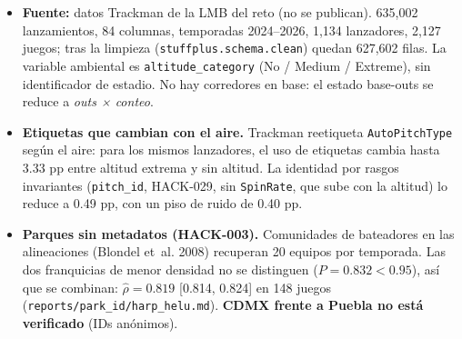 \documentclass[
  english,
  spanish,
  10pt,
  letterpaper,
]{article}
\providecommand{\tightlist}{%
  \setlength{\itemsep}{0pt}\setlength{\parskip}{0pt}}
\let\diablosTT\texttt
\renewcommand{\texttt}[1]{{\color{gris}\fontsize{8.2}{10}\selectfont\diablosTT{#1}}}
\begin{document}
\begin{itemize}
\tightlist
\item
  \textbf{Fuente:} datos Trackman de la LMB del reto (no se publican).
  635,002 lanzamientos, 84 columnas, temporadas 2024--2026, 1,134
  lanzadores, 2,127 juegos; tras la limpieza
  (\texttt{stuffplus.schema.clean}) quedan 627,602 filas. La variable
  ambiental es \texttt{altitude\_category} (No / Medium / Extreme), sin
  identificador de estadio. No hay corredores en base: el estado
  base-outs se reduce a \emph{outs × conteo}.
\item
  \textbf{Etiquetas que cambian con el aire.} Trackman reetiqueta
  \texttt{AutoPitchType} según el aire: para los mismos lanzadores, el
  uso de etiquetas cambia hasta 3.33 pp entre altitud extrema y sin
  altitud. La identidad por rasgos invariantes (\texttt{pitch\_id},
  HACK-029, sin \texttt{SpinRate}, que sube con la altitud) lo reduce a
  0.49 pp, con un piso de ruido de 0.40 pp.
\item
  \textbf{Parques sin metadatos (HACK-003).} Comunidades de bateadores
  en las alineaciones (Blondel et~al. 2008) recuperan 20 equipos por
  temporada. Las dos franquicias de menor densidad no se distinguen
  (\(P = 0.832 < 0.95\)), así que se combinan: \(\hat\rho=0.819\)
  {[}0.814, 0.824{]} en 148 juegos
  (\texttt{reports/park\_id/harp\_helu.md}). \textbf{CDMX frente a
  Puebla no está verificado} (IDs anónimos).
\end{itemize}
\end{document}
